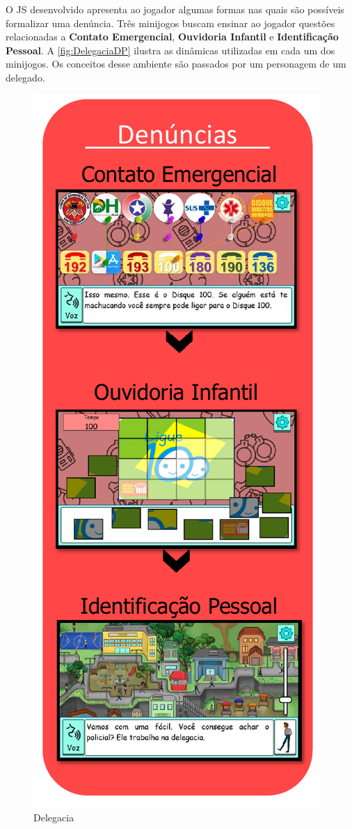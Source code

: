 O \ac{JS} desenvolvido apresenta ao jogador algumas formas nas quais são possíveis formalizar uma denúncia. Três minijogos buscam ensinar ao jogador questões relacionadas a \textbf{Contato Emergencial}, \textbf{Ouvidoria Infantil} e \textbf{Identificação Pessoal}. A \autoref{fig:DelegaciaDP} ilustra as dinâmicas utilizadas em cada um dos minijogos. Os conceitos desse ambiente são passados por um personagem de um delegado. 

\begin{figure}%
  \vspace{-20pt}
  \caption{\label{fig:DelegaciaDP}Delegacia}
  \includegraphics[width=\linewidth]{./Visuais/Delegacia2.pdf}

\end{figure}
